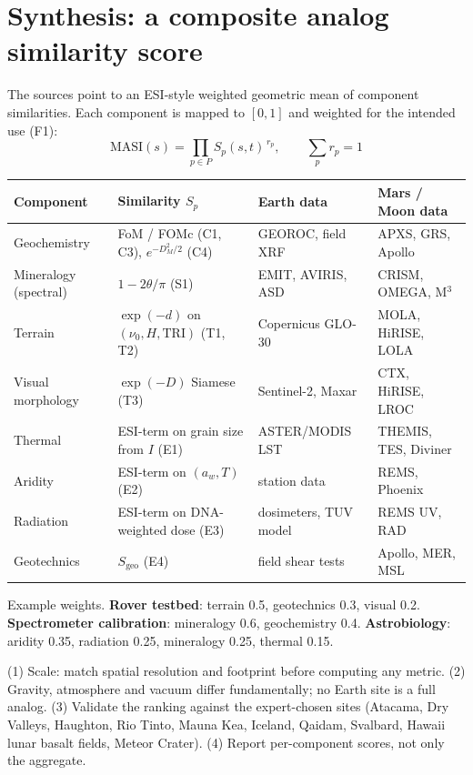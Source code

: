 \documentclass[11pt,a4paper]{article}
\begin{document}
\section{Synthesis: a composite analog similarity score}

The sources point to an ESI-style weighted geometric mean of component similarities. Each component is mapped to $[0,1]$ and weighted for the intended use (F1):
\begin{equation}
  \boxed{\;\mathrm{MASI}(s)=\prod_{p\in P} S_p(s,t)^{\,r_p},\qquad \sum_p r_p=1\;}
\end{equation}
\begin{center}
\begin{tabularx}{\textwidth}{@{}l X l l@{}}
\toprule
\textbf{Component} & \textbf{Similarity $S_p$} & \textbf{Earth data} & \textbf{Mars / Moon data}\\
\midrule
Geochemistry & FoM / FOMc (C1, C3), $e^{-D_M^2/2}$ (C4) & GEOROC, field XRF & APXS, GRS, Apollo\\
Mineralogy (spectral) & $1-2\theta/\pi$ (S1) & EMIT, AVIRIS, ASD & CRISM, OMEGA, M$^3$\\
Terrain & $\exp(-d)$ on $(\nu_0,H,\mathrm{TRI})$ (T1, T2) & Copernicus GLO-30 & MOLA, HiRISE, LOLA\\
Visual morphology & $\exp(-D)$ Siamese (T3) & Sentinel-2, Maxar & CTX, HiRISE, LROC\\
Thermal & ESI-term on grain size from $I$ (E1) & ASTER/MODIS LST & THEMIS, TES, Diviner\\
Aridity & ESI-term on $(a_w,T)$ (E2) & station data & REMS, Phoenix\\
Radiation & ESI-term on DNA-weighted dose (E3) & dosimeters, TUV model & REMS UV, RAD\\
Geotechnics & $S_{\text{geo}}$ (E4) & field shear tests & Apollo, MER, MSL\\
\bottomrule
\end{tabularx}
\end{center}

Example weights. \textbf{Rover testbed}: terrain 0.5, geotechnics 0.3, visual 0.2. \textbf{Spectrometer calibration}: mineralogy 0.6, geochemistry 0.4. \textbf{Astrobiology}: aridity 0.35, radiation 0.25, mineralogy 0.25, thermal 0.15.

\begin{caveat}
(1) Scale: match spatial resolution and footprint before computing any metric. (2) Gravity, atmosphere and vacuum differ fundamentally; no Earth site is a full analog. (3) Validate the ranking against the expert-chosen sites (Atacama, Dry Valleys, Haughton, Rio Tinto, Mauna Kea, Iceland, Qaidam, Svalbard, Hawaii lunar basalt fields, Meteor Crater). (4) Report per-component scores, not only the aggregate.
\end{caveat}
\end{document}
